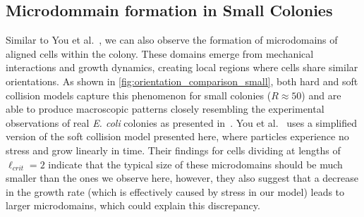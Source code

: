 \documentclass[conference]{IEEEtran}
\begin{document}
\subsection{Microdommain formation in Small Colonies}


Similar to You et al.~\cite{You2018,You_2021}, we can also observe the formation of microdomains of aligned cells within the colony. These domains emerge from mechanical interactions and growth dynamics, creating local regions where cells share similar orientations. As shown in \autoref{fig:orientation_comparison_small}, both hard and soft collision models capture this phenomenon for small colonies ($R \approx 50$) and are able to produce macroscopic patterns closely resembling the experimental observations of real \textit{E. coli} colonies as presented in~\cite{You2018}. You et al.~\cite{You2018} uses a simplified version of the soft collision model presented here, where particles experience no stress and grow linearly in time. Their findings for cells dividing at lengths of $\ell_{crit} = 2$ indicate that the typical size of these microdomains should be much smaller than the ones we observe here, however, they also suggest that a decrease in the growth rate (which is effectively caused by stress in our model) leads to larger microdomains, which could explain this discrepancy.
\end{document}

